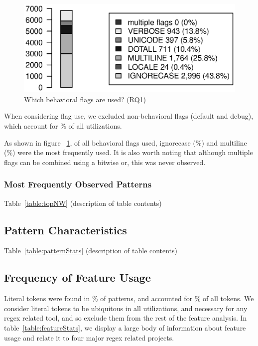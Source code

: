 \begin{figure}[tb]
\centering
\includegraphics[width=\columnwidth]{../analysis_output/partFlags.eps}
\caption{Which behavioral flags are used? (RQ1)}
\label{fig:partFlags}
\end{figure}

When considering flag use, we excluded non-behavioral flags (default and debug), which account for \% of all utilizations.

 As shown in figure ~\ref{fig:partFlags}, of all behavioral flags used, ignorecase (\%) and multiline (\%) were the most frequently used.  It is also worth noting that although multiple flags can be combined using a bitwise or, this was never observed.


\subsubsection{Most Frequently Observed Patterns}

Table~\ref{table:topNW} (description of table contents)



\subsection{Pattern Characteristics}

Table~\ref{table:patternStats} (description of table contents)



\subsection{Frequency of Feature Usage}

Literal tokens were found in \% of patterns, and accounted for \% of all tokens.  We consider literal tokens to be ubiquitous in all utilizations, and necessary for any regex related tool, and so exclude them from the rest of the feature analysis.  In table~\ref{table:featureStats}, we display a large body of information about feature usage and relate it to four major regex related projects.

